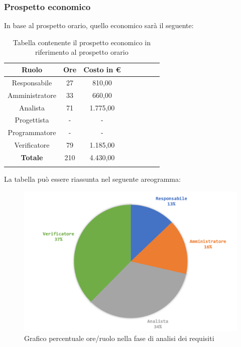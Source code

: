 			\subsubsection{Prospetto economico}
			In base al prospetto orario, quello economico sarà il seguente: 
			
			\begin{longtable}{|c|c|c|c|c|c|c|c|}
				\hline
				\rowcolor{lighter-grayer}
				\textbf{Ruolo} & \textbf{Ore} & \textbf{Costo in €} \\
				\hline
				\endfirsthead
				
				\hline
				Responsabile & 27 & 810,00\\
				\hline
				\hline
				Amministratore & 33 & 660,00\\
				\hline
				\hline
				Analista & 71 & 1.775,00\\
				\hline
				\hline
				Progettista & - & -\\
				\hline
				\hline
				Programmatore & - & -\\
				\hline
				\hline
				Verificatore & 79 & 1.185,00\\
				\hline
				\textbf{Totale} & 210 & 4.430,00\\
				\hline
				\caption{Tabella contenente il prospetto economico in riferimento al prospetto orario}
			\end{longtable}
			\pagebreak
		
			La tabella può essere riassunta nel seguente areogramma:
			\begin{figure}[H]
				\centering
				\includegraphics[width=0.8\linewidth]{./images/preventivo/analisi2.png}
				\caption{Grafico percentuale ore/ruolo nella fase di analisi dei requisiti}
				\label{fig:grafico costi ruolo fase analisi dei requisiti}
			\end{figure}
		

